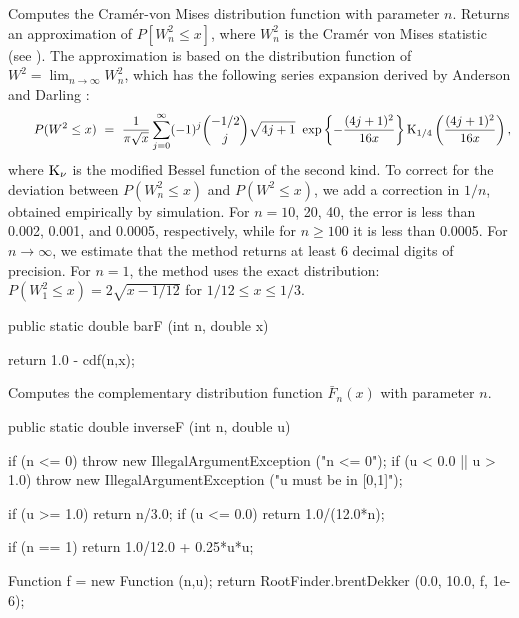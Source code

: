 \begin{tabb}
  Computes the Cram\'er-von Mises distribution function with parameter $n$.
  Returns an approximation of $P[W_n^2 \le x]$, where $W_n^2$ is the
  Cram\'er von Mises  statistic (see \cite{tSTE70a,tSTE86b,tAND52a,tKNO74a}).
  The approximation is based on the distribution function of $W^2 =
  \lim_{n\to\infty} W_n^2$, which has the following series expansion derived
  by Anderson and Darling \cite{tAND52a}:
   $$ \qquad
   P(W^2 \le x)  \ = \ \frac1{\pi\sqrt x} \sum_{j=0}^\infty (-1)^j 
   \binom{-1/2}{j} \sqrt{4j+1}\;\;
    {\rm exp}\left\{-\frac{(4j+1)^2}{16 x}\right\}
    {\rm K}_{1/4}\left(\frac{(4j+1)^2}{16 x}\right),
   $$
  where ${\rm K}_{\nu}$ is the  modified Bessel function of the 
  second kind.
  To correct for the deviation between $P(W_n^2\le x)$ and $P(W^2\le x)$,
  we add a correction in $1/n$, obtained empirically by simulation.
  For $n = 10$, 20, 40, the error is less than
  0.002, 0.001, and 0.0005, respectively, while for
  $n \ge 100$ it is less than 0.0005.
  For $n \to\infty$, we estimate that the method returns
  at least 6 decimal digits of precision.
  For $n = 1$, the method uses the exact distribution:
  $P(W_1^2 \le x) = 2 \sqrt {x - 1/12}$ for $1/12 \le x \le 1/3$.
 \end{tabb}
\begin{code}

   public static double barF (int n, double x)\begin{hide} {
      return 1.0 - cdf(n,x);
   }\end{hide}
\end{code}
\begin{tabb}
  Computes the complementary distribution function $\bar F_n(x)$
  with parameter $n$.
\end{tabb}
\begin{code}

   public static double inverseF (int n, double u)\begin{hide} {
      if (n <= 0)
         throw new IllegalArgumentException ("n <= 0");
      if (u < 0.0 || u > 1.0)
         throw new IllegalArgumentException ("u must be in [0,1]");

      if (u >= 1.0)
         return n/3.0;
      if (u <= 0.0)
         return 1.0/(12.0*n);

      if (n == 1)
         return 1.0/12.0 + 0.25*u*u;

      Function f = new Function (n,u);
      return RootFinder.brentDekker (0.0, 10.0, f, 1e-6);
   }\end{hide}
\end{code}
